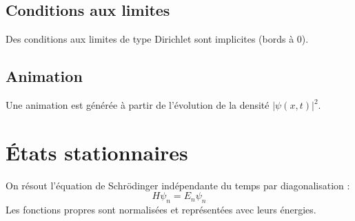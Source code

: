 \documentclass[11pt]{article}
\begin{document}
\subsection*{Conditions aux limites}
Des conditions aux limites de type Dirichlet sont implicites (bords à 0).

\subsection*{Animation}
Une animation est générée à partir de l'évolution de la densité $|\psi(x,t)|^2$.

\section*{États stationnaires}
On résout l'équation de Schrödinger indépendante du temps par diagonalisation :
\[
H \psi_n = E_n \psi_n
\]
Les fonctions propres sont normalisées et représentées avec leurs énergies.
\end{document}
